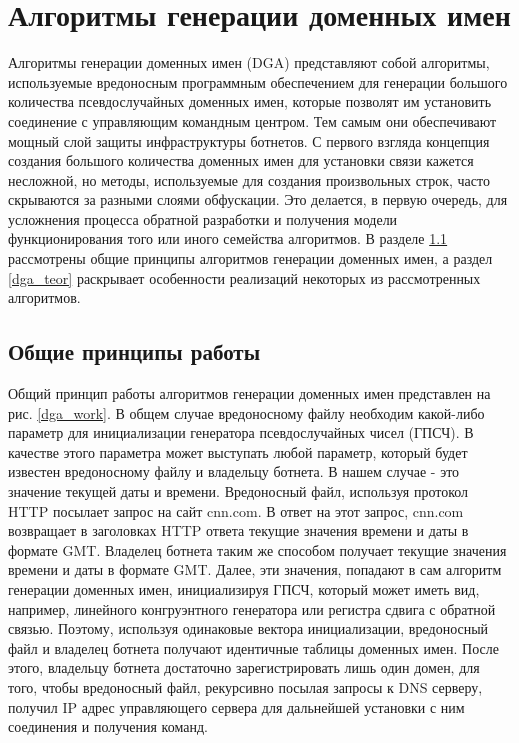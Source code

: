 \section{Алгоритмы генерации доменных имен}\label{dga}
Алгоритмы генерации доменных имен (DGA) представляют собой алгоритмы, используемые вредоносным программным обеспечением для генерации большого количества псевдослучайных доменных имен, которые позволят им установить соединение с управляющим командным центром. Тем самым они обеспечивают мощный слой защиты инфраструктуры ботнетов. С первого взгляда концепция создания большого количества доменных имен для установки связи кажется несложной, но методы, используемые для создания произвольных строк, часто скрываются за разными слоями обфускации. Это делается, в первую очередь, для усложнения процесса обратной разработки и получения модели функционирования того или иного семейства алгоритмов. В разделе \ref{work_princip} рассмотрены общие принципы алгоритмов генерации доменных имен, а раздел \ref{dga_teor} раскрывает особенности реализаций некоторых из рассмотренных алгоритмов.

    \subsection{Общие принципы работы}\label{work_princip}
        Общий принцип работы алгоритмов генерации доменных имен представлен на рис. \ref{dga_work}. В общем случае вредоносному файлу необходим какой-либо параметр для инициализации генератора псевдослучайных чисел (ГПСЧ). В качестве этого параметра может выступать любой параметр, который будет известен вредоносному файлу и владельцу ботнета. В нашем случае - это значение текущей даты и времени. Вредоносный файл, используя протокол HTTP посылает запрос на сайт cnn.com. В ответ на этот запрос, cnn.com возвращает в заголовках HTTP ответа текущие значения времени и даты в формате GMT. Владелец ботнета таким же способом получает текущие значения времени и даты в формате GMT. Далее, эти значения, попадают в сам алгоритм генерации доменных имен, инициализируя ГПСЧ, который может иметь вид, например, линейного конгруэнтного генератора или  регистра сдвига с обратной связью. Поэтому, используя одинаковые вектора инициализации, вредоносный файл и владелец ботнета получают идентичные таблицы доменных имен.
        После этого, владельцу ботнета достаточно зарегистрировать лишь один домен, для того, чтобы вредоносный файл, рекурсивно посылая запросы к DNS серверу, получил IP адрес управляющего сервера для дальнейшей установки с ним соединения и получения команд.

